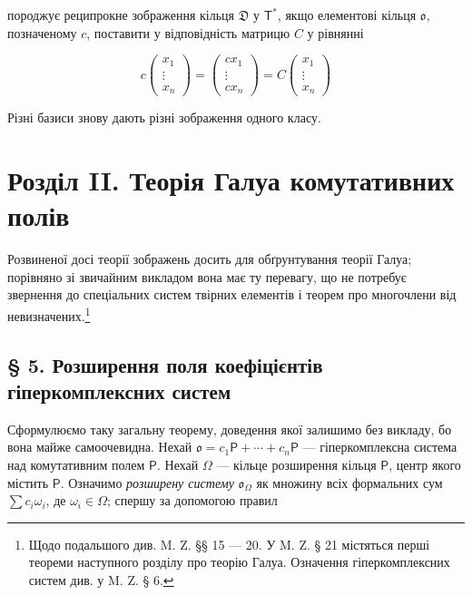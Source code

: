 \documentclass[11pt]{article}
\newcommand{\srcfn}[2]{\footnote{#2}}
\begin{document}
породжує реципрокне зображення кільця \(\mathfrak D\) у \(\mathsf T^*\), якщо елементові кільця \(\mathfrak{o}\), позначеному \(c\), поставити у відповідність матрицю \(C\) у рівнянні

\[
c\begin{pmatrix}x_1\\ \vdots\\ x_n\end{pmatrix}
=\begin{pmatrix}cx_1\\ \vdots\\ cx_n\end{pmatrix}
=C\begin{pmatrix}x_1\\ \vdots\\ x_n\end{pmatrix}
\]

Різні базиси знову дають різні зображення одного класу.

\section*{Розділ II. Теорія Галуа комутативних полів}\label{kapitel-ii.-galoissche-theorie-kommutativer-koerper}

Розвиненої досі теорії зображень досить для обґрунтування теорії Галуа; порівняно зі звичайним викладом вона має ту перевагу, що не потребує звернення до спеціальних систем твірних елементів і теорем про многочлени від невизначених.\srcfn{1}{Щодо подальшого див. M. Z. §§ 15 --- 20. У M. Z. § 21 містяться перші теореми наступного розділу про теорію Галуа. Означення гіперкомплексних систем див. у M. Z. § 6.}

\subsection*{§ 5. Розширення поля коефіцієнтів гіперкомплексних систем}\label{koeffizientenerweiterung-hyperkomplexer-systeme}

Сформулюємо таку загальну теорему, доведення якої залишимо без викладу, бо вона майже самоочевидна. Нехай \(\mathfrak{o}=c_1\mathsf P+\cdots+c_n\mathsf P\) --- гіперкомплексна система над комутативним полем \(\mathsf P\). Нехай \(\Omega\) --- кільце розширення кільця \(\mathsf P\), центр якого містить \(\mathsf P\). Означимо \emph{розширену систему} \(\mathfrak{o}_{\Omega}\) як множину всіх формальних сум \(\sum c_i\omega_i\), де \(\omega_i\in\Omega\); спершу за допомогою правил
\end{document}
